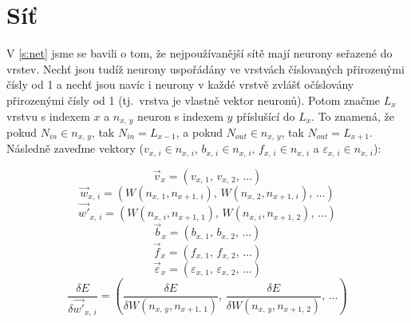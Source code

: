 \documentclass[12pt]{report}			%
\begin{document}
				\section{Síť} \label{s:n}
					V \ref{s:net} jsme se bavili o tom, že nejpoužívanější sítě mají neurony seřazené do vrstev. Nechť jsou tudíž neurony uspořádány ve vrstvách číslovaných přirozenými čísly od 1 a nechť jsou navíc i neurony v každé vrstvě zvlášť očíslovány přirozenými čísly od 1 (tj.~vrstva je vlastně vektor neuronů). Potom značme $L_x$ vrstvu s indexem $x$ a $n_{x,\,y}$ neuron s indexem $y$ příslušící do $L_x$. To znamená, že pokud $N_{in} \in n_{x,\,y}$, tak $N_{in} = L_{x-1}$, a pokud $N_{out} \in n_{x,\,y}$, tak $N_{out} = L_{x+1}$. Následně zaveďme vektory ($v_{x,\,i} \in n_{x,\,i}$, $b_{x,\,i} \in n_{x,\,i}$, $f_{x,\,i} \in n_{x,\,i}$ a $\varepsilon_{x,\,i} \in n_{x,\,i}$):
					
					\begin{equation} \vec{v}_x = \left(v_{x,\,1},\,v_{x,\,2},\,\ldots\right) \end{equation}
					\begin{equation} \vec{w}_{x,\,i} = \left(W\left(n_{x,\,1}, n_{x+1,\,i}\right),\,W\left(n_{x,\,2}, n_{x+1,\,i}\right),\,\ldots\right) \end{equation}
					\begin{equation} \vec{w'}_{x,\,i} = \left(W\left(n_{x,\,i}, n_{x+1,\,1}\right),\,W\left(n_{x,\,i}, n_{x+1,\,2}\right),\,\ldots\right) \end{equation}
					\begin{equation} \vec{b}_x = \left(b_{x,\,1},\,b_{x,\,2},\,\ldots\right) \end{equation}
					\begin{equation} \vec{f}_x = \left(f_{x,\,1},\,f_{x,\,2},\,\ldots\right) \end{equation}
					\begin{equation} \vec{\varepsilon}_x = \left(\varepsilon_{x,\,1},\,\varepsilon_{x,\,2},\,\ldots\right) \end{equation}
					\begin{equation} \frac{\delta E}{\delta\vec{w'}_{x,\,i}} = \left(\frac{\delta E}{\delta W\left(n_{x,\,y}, n_{x+1,\,1}\right)},\,\frac{\delta E}{\delta W\left(n_{x,\,y}, n_{x+1,\,2}\right)},\,\ldots\right) \end{equation}
					
\end{document}
